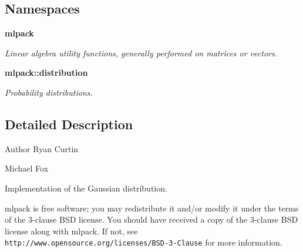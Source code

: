 \subsection*{Namespaces}
\begin{DoxyCompactItemize}
\item 
 {\bf mlpack}
\begin{DoxyCompactList}\small\item\em Linear algebra utility functions, generally performed on matrices or vectors. \end{DoxyCompactList}\item 
 {\bf mlpack\+::distribution}
\begin{DoxyCompactList}\small\item\em Probability distributions. \end{DoxyCompactList}\end{DoxyCompactItemize}


\subsection{Detailed Description}
\begin{DoxyAuthor}{Author}
Ryan Curtin 

Michael Fox
\end{DoxyAuthor}
Implementation of the Gaussian distribution.

mlpack is free software; you may redistribute it and/or modify it under the terms of the 3-\/clause B\+SD license. You should have received a copy of the 3-\/clause B\+SD license along with mlpack. If not, see {\tt http\+://www.\+opensource.\+org/licenses/\+B\+S\+D-\/3-\/\+Clause} for more information. 
